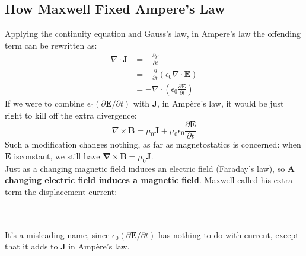 \subsection{How Maxwell Fixed Ampere's Law}
Applying the continuity equation  and Gauss's law, in  Ampere's law the offending term can be rewritten as:
\begin{align*}
\nabla \cdot \mathbf{J}&=-\frac{\partial \rho}{\partial t}\\
&=-\frac{\partial}{\partial t}\left(\epsilon_{0} \nabla \cdot \mathbf{E}\right)\\&=-\nabla \cdot\left(\epsilon_{0} \frac{\partial \mathbf{E}}{\partial t}\right)
\end{align*}
If we were to combine $\epsilon_{0}(\partial \mathbf{E} / \partial t)$ with $\mathbf{J}$, in Ampère's law, it would be just right to kill off the extra divergence:$$\nabla \times \mathbf{B}=\mu_{0} \mathbf{J}+\mu_{0} \epsilon_{0} \frac{\partial \mathbf{E}}{\partial t}$$ Such a modification changes nothing, as far as magnetostatics is concerned: when $\mathbf{E}$ isconstant, we still have $\boldsymbol{\nabla} \times \mathbf{B}=\mu_{0} \mathbf{J}$.\\
Just as a changing magnetic field induces an electric field (Faraday's law), so \textbf{A changing electric field induces a magnetic field}.  Maxwell called his extra term the displacement current:

\hspace{5.10cm}
\\\\ It's a misleading name, since $\epsilon_{0}(\partial \mathbf{E} / \partial t)$ has nothing to do with current, except that it adds to $\mathbf{J}$ in Ampère's law.
